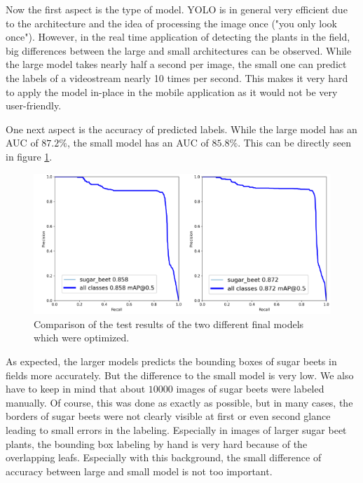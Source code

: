 Now the first aspect is the type of model. YOLO is in general very efficient due to the architecture and the idea of processing the image once ("you only look once"). However, in the real time application of detecting the plants in the field, big differences between the large and small architectures can be observed. While the large model takes nearly half a second per image, the small one can predict the labels of a videostream nearly 10 times per second. This makes it very hard to apply the model in-place in the mobile application as it would not be very user-friendly.

One next aspect is the accuracy of predicted labels. While the large model has an AUC of $ 87.2\% $, the small model has an AUC of $ 85.8\% $. This can be directly seen in figure \ref{fig:final_comparison}. 

\begin{figure}[htb!]
	\centering
	\includegraphics[scale=0.6]{figures/final_comparison.png}
	\caption{Comparison of the test results of the two different final models which were optimized.}
	\label{fig:final_comparison}
\end{figure}

As expected, the larger models predicts the bounding boxes of sugar beets in fields more accurately. But the difference to the small model is very low. We also have to keep in mind that about $ 10000 $ images of sugar beets were labeled manually. Of course, this was done as exactly as possible, but in many cases, the borders of sugar beets were not clearly visible at first or even second glance leading to small errors in the labeling. Especially in images of larger sugar beet plants, the bounding box labeling by hand is very hard because of the overlapping leafs. Especially with this background, the small difference of accuracy between large and small model is not too important.\\

